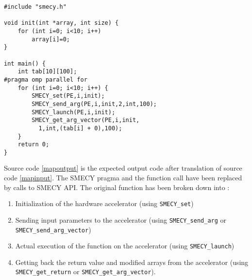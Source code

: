 \documentclass[a4paper]{article}
\begin{document}
	\begin{lstlisting}[label=mapoutput,caption={Expected output code}]
#include "smecy.h"

void init(int *array, int size) {
	for (int i=0; i<10; i++)
		array[i]=0;
}

int main() {
	int tab[10][100];
#pragma omp parallel for
	for (int i=0; i<10; i++) {
		SMECY_set(PE,i,init);
		SMECY_send_arg(PE,i,init,2,int,100);
		SMECY_launch(PE,i,init);
		SMECY_get_arg_vector(PE,i,init,
		  1,int,(tab[i] + 0),100);
	}
	return 0;
}
	\end{lstlisting}
	Source code \ref{mapoutput} is the expected output code after translation of source code \ref{mapinput}. The SMECY pragma and the function call have been replaced by calls to SMECY API. The original function has been broken down into :
	\begin{enumerate}
		\item Initialization of the hardware accelerator (using \verb+SMECY_set+)
		\item Sending input parameters to the accelerator (using \verb+SMECY_send_arg+ or \verb+SMECY_send_arg_vector+)
		\item Actual execution of the function on the accelerator (using \verb+SMECY_launch+)
		\item Getting back the return value and modified arrays from the accelerator (using \verb+SMECY_get_return+ or \verb+SMECY_get_arg_vector+).
	\end{enumerate}
	
\end{document}
